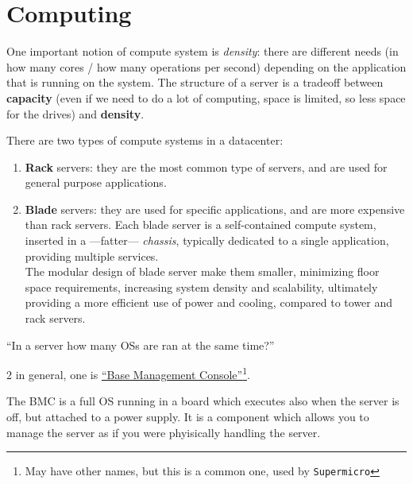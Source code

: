 \chapter{Computing}
One important notion of compute system is \textit{density}: there are different needs (in how many cores / how many operations per second) depending on the application that is running on the system. The structure of a server is a tradeoff between \textbf{capacity} (even if we need to do a lot of computing, space is limited, so less space for the drives) and \textbf{density}.

There are two types of compute systems in a datacenter:\ns
\begin{enumerate}
   \item \textbf{Rack} servers: they are the most common type of servers, and are used for general purpose applications.
   \item \textbf{Blade} servers: they are used for specific applications, and are more expensive than rack servers.
   Each blade server is a self-contained compute system, inserted in a ---fatter--- \textit{chassis}, typically dedicated to a single application, providing multiple services.\\
   The modular design of blade server make them smaller, minimizing floor space requirements, increasing system density and scalability, ultimately providing a more efficient use of power and cooling, compared to tower and rack servers.
\end{enumerate}

\begin{center}
   ``In a server how many OSs are ran at the same time?''
\end{center}
2 in general, one is \ul{``Base Management Console''}\footnote{May have other names, but this is a common one, used by \texttt{Supermicro}}.

The BMC is a full OS running in a board which executes also when the server is off, but attached to a power supply. It is a component which allows you to manage the server as if you were phyisically handling the server.

